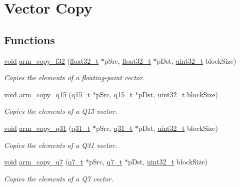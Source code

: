 \hypertarget{group__copy}{\section{Vector Copy}
\label{group__copy}
}
\subsection*{Functions}
\begin{DoxyCompactItemize}
\item 
\hyperlink{group___n_a_m_e_ga18028b8badbf1ea7e704ccac3c488e82}{void} \hyperlink{group__copy_gadd1f737e677e0e6ca31767c7001417b3}{arm\-\_\-copy\-\_\-f32} (\hyperlink{arm__math_8h_a4611b605e45ab401f02cab15c5e38715}{float32\-\_\-t} $\ast$p\-Src, \hyperlink{arm__math_8h_a4611b605e45ab401f02cab15c5e38715}{float32\-\_\-t} $\ast$p\-Dst, \hyperlink{stdint_8h_a435d1572bf3f880d55459d9805097f62}{uint32\-\_\-t} block\-Size)
\begin{DoxyCompactList}\small\item\em Copies the elements of a floating-\/point vector. \end{DoxyCompactList}\item 
\hyperlink{group___n_a_m_e_ga18028b8badbf1ea7e704ccac3c488e82}{void} \hyperlink{group__copy_ga872ca4cfc18c680b8991ccd569a5fda0}{arm\-\_\-copy\-\_\-q15} (\hyperlink{arm__math_8h_ab5a8fb21a5b3b983d5f54f31614052ea}{q15\-\_\-t} $\ast$p\-Src, \hyperlink{arm__math_8h_ab5a8fb21a5b3b983d5f54f31614052ea}{q15\-\_\-t} $\ast$p\-Dst, \hyperlink{stdint_8h_a435d1572bf3f880d55459d9805097f62}{uint32\-\_\-t} block\-Size)
\begin{DoxyCompactList}\small\item\em Copies the elements of a Q15 vector. \end{DoxyCompactList}\item 
\hyperlink{group___n_a_m_e_ga18028b8badbf1ea7e704ccac3c488e82}{void} \hyperlink{group__copy_gaddf70be7e3f87e535c324862b501f3f9}{arm\-\_\-copy\-\_\-q31} (\hyperlink{arm__math_8h_adc89a3547f5324b7b3b95adec3806bc0}{q31\-\_\-t} $\ast$p\-Src, \hyperlink{arm__math_8h_adc89a3547f5324b7b3b95adec3806bc0}{q31\-\_\-t} $\ast$p\-Dst, \hyperlink{stdint_8h_a435d1572bf3f880d55459d9805097f62}{uint32\-\_\-t} block\-Size)
\begin{DoxyCompactList}\small\item\em Copies the elements of a Q31 vector. \end{DoxyCompactList}\item 
\hyperlink{group___n_a_m_e_ga18028b8badbf1ea7e704ccac3c488e82}{void} \hyperlink{group__copy_ga467579beda492aa92797529d794c88fb}{arm\-\_\-copy\-\_\-q7} (\hyperlink{arm__math_8h_ae541b6f232c305361e9b416fc9eed263}{q7\-\_\-t} $\ast$p\-Src, \hyperlink{arm__math_8h_ae541b6f232c305361e9b416fc9eed263}{q7\-\_\-t} $\ast$p\-Dst, \hyperlink{stdint_8h_a435d1572bf3f880d55459d9805097f62}{uint32\-\_\-t} block\-Size)
\begin{DoxyCompactList}\small\item\em Copies the elements of a Q7 vector. \end{DoxyCompactList}\end{DoxyCompactItemize}


